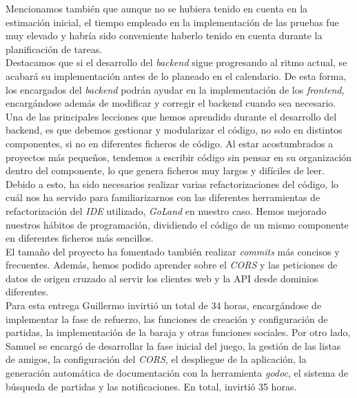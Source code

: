 \documentclass[11pt, a4paper, titlepage]{article}
\begin{document}
Mencionamos también que aunque no se hubiera tenido en cuenta en la estimación inicial, el tiempo empleado en la implementación de las pruebas fue muy elevado y habría sido conveniente haberlo tenido en cuenta durante la planificación de tareas. \\  

Destacamos que si el desarrollo del \textit{backend} sigue progresando al ritmo actual, se acabará su implementación antes de lo planeado en el calendario. De esta forma, los encargados del \textit{backend} podrán ayudar en la implementación de los \textit{frontend}, encargándose además de modificar y corregir el backend cuando sea necesario. \\

Una de las principales lecciones que hemos aprendido durante el desarrollo del backend, es que debemos gestionar y modularizar el código, no solo en distintos componentes, si no en diferentes ficheros de código. Al estar acostumbrados a proyectos más pequeños, tendemos a escribir código sin pensar en su organización dentro del componente, lo que genera ficheros muy largos y difíciles de leer.\\


Debido a esto, ha sido necesarios realizar varias refactorizaciones del código, lo cuál nos ha servido para familiarizarnos con las diferentes herramientas de refactorización del \textit{IDE} utilizado, \textit{GoLand} en nuestro caso. Hemos mejorado nuestros hábitos de programación, dividiendo el código de un mismo componente en diferentes ficheros más sencillos.\\

El tamaño del proyecto ha fomentado también realizar \textit{commits} más concisos y frecuentes.
Además, hemos podido aprender sobre el \textit{CORS} y las peticiones de datos de origen cruzado al servir los clientes web y la API desde dominios diferentes. \\

Para esta entrega Guillermo invirtió un total de 34 horas, encargándose de implementar la fase de refuerzo, las funciones de creación y configuración de partidas, la implementación de la baraja y otras funciones sociales. Por otro lado, Samuel se encargó de desarrollar la fase inicial del juego, la gestión de las listas de amigos, la configuración del \textit{CORS}, el despliegue de la aplicación, la generación automática de documentación con la herramienta \textit{godoc}, el sistema de búsqueda de partidas y las notificaciones. En total, invirtió 35 horas. \\
\end{document}
